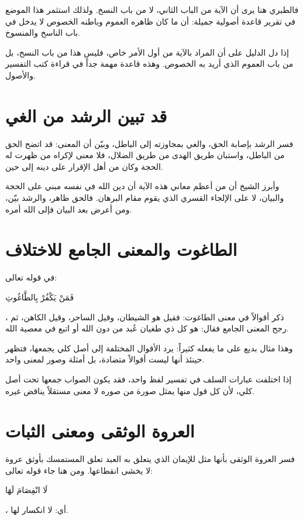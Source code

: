 فالطبري هنا يرى أن الآية من الباب الثاني، لا من باب النسخ. ولذلك استثمر هذا الموضع في تقرير قاعدة أصولية جميلة: أن ما كان ظاهره العموم وباطنه الخصوص لا يدخل في باب الناسخ والمنسوخ.

\begin{fawaid}
إذا دل الدليل على أن المراد بالآية من أول الأمر خاص، فليس هذا من باب النسخ، بل من باب العموم الذي أريد به الخصوص. وهذه قاعدة مهمة جداً في قراءة كتب التفسير والأصول.
\end{fawaid}

\section{قد تبين الرشد من الغي}
فسر  الرشد بإصابة الحق، والغي بمجاوزته إلى الباطل، وبيّن أن المعنى: قد اتضح الحق من الباطل، واستبان طريق الهدى من طريق الضلال، فلا معنى لإكراه من ظهرت له الحجة وكان من أهل الإقرار على دينه إلى حين.

وأبرز الشيخ أن من أعظم معاني هذه الآية أن دين الله في نفسه مبني على الحجة والبيان، لا على الإلجاء القسري الذي يقوم مقام البرهان. فالحق ظاهر، والرشد بيّن، ومن أعرض بعد البيان فإلى الله أمره.

\section{الطاغوت والمعنى الجامع للاختلاف}
في قوله تعالى: \begin{ayah}فَمَنْ يَكْفُرْ بِالطَّاغُوتِ\end{ayah}، ذكر  أقوالاً في معنى الطاغوت: فقيل هو الشيطان، وقيل الساحر، وقيل الكاهن، ثم رجح المعنى الجامع فقال: هو كل ذي طغيان عُبد من دون الله أو اتبع في معصية الله.

وهذا مثال بديع على ما يفعله  كثيراً: يرد الأقوال المختلفة إلى أصل كلي يجمعها، فتظهر حينئذ أنها ليست أقوالاً متضادة، بل أمثلة وصور لمعنى واحد.

\begin{fawaid}
إذا اختلفت عبارات السلف في تفسير لفظ واحد، فقد يكون الصواب جمعها تحت أصل كلي، لأن كل قول منها يمثل صورة من صوره لا معنى مستقلاً يناقض غيره.
\end{fawaid}

\section{العروة الوثقى ومعنى الثبات}
فسر  العروة الوثقى بأنها مثل للإيمان الذي يتعلق به العبد تعلق المستمسك بأوثق عروة لا يخشى انقطاعها. ومن هنا جاء قوله تعالى: \begin{ayah}لَا انْفِصَامَ لَهَا\end{ayah}، أي: لا انكسار لها.


